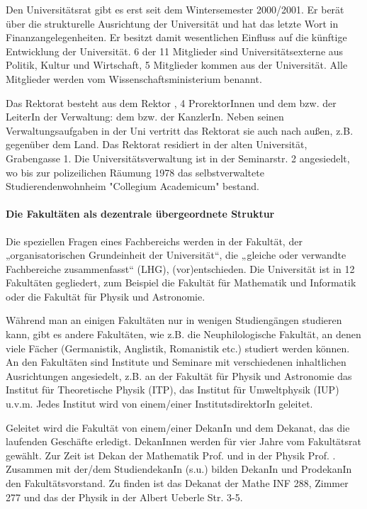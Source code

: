Den Universitätsrat gibt es erst seit dem Wintersemester 2000/2001. Er berät über die strukturelle
Ausrichtung der Universität und hat das letzte Wort in
Finanzangelegenheiten. Er besitzt damit wesentlichen Einfluss auf die
künftige Entwicklung der Universität. 6 der 11 Mitglieder sind
Universitätsexterne aus Politik, Kultur und Wirtschaft, 5 Mitglieder
kommen aus der Universität. Alle Mitglieder werden vom
Wissenschaftsministerium benannt.

Das Rektorat besteht aus dem Rektor \rektor, 4 ProrektorInnen und dem bzw. der LeiterIn der Verwaltung: dem bzw. der KanzlerIn. Neben seinen Verwaltungsaufgaben in der Uni vertritt das Rektorat sie auch nach außen, z.B. gegenüber dem Land. Das Rektorat residiert in der alten Universität, Grabengasse 1.
Die Universitätsverwaltung ist in der Seminarstr. 2 angesiedelt, wo bis zur polizeilichen Räumung 1978 das selbstverwaltete Studierendenwohnheim "Collegium Academicum" bestand.


\paragraph{Die Fakultäten als dezentrale übergeordnete Struktur}

Die speziellen Fragen eines Fachbereichs werden in der Fakultät, der
„organisatorischen Grundeinheit der Universität“, die „gleiche oder
verwandte Fachbereiche zusammenfasst“ (LHG), (vor)entschieden. Die
Universität ist in 12 Fakultäten gegliedert, zum Beispiel die Fakultät für
Mathematik und Informatik oder die Fakultät für Physik und Astronomie.

Während man an einigen Fakultäten nur in wenigen Studiengängen studieren
kann, gibt es andere Fakultäten, wie z.B. die Neuphilologische Fakultät,
an denen viele Fächer (Germanistik, Anglistik, Romanistik etc.) studiert
werden können. An den Fakultäten sind Institute und Seminare mit verschiedenen inhaltlichen Ausrichtungen angesiedelt, z.B. an der Fakultät für Physik und Astronomie das Institut für Theoretische Physik (ITP), das Institut für Umweltphysik (IUP) u.v.m. Jedes Institut wird von einem/einer InstitutsdirektorIn geleitet.

Geleitet wird die Fakultät von einem/einer DekanIn und dem Dekanat, das die laufenden Geschäfte erledigt. DekanInnen werden für vier Jahre vom Fakultätsrat gewählt. Zur Zeit ist Dekan der Mathematik Prof. \dekanmathe{} und in der Physik Prof. \dekanphysik. Zusammen mit der/dem
StudiendekanIn (s.u.) bilden DekanIn und ProdekanIn den Fakultätsvorstand. Zu finden ist das Dekanat der Mathe \gls{INF} 288, Zimmer 277 und das der Physik in der Albert Ueberle Str. 3-5.

